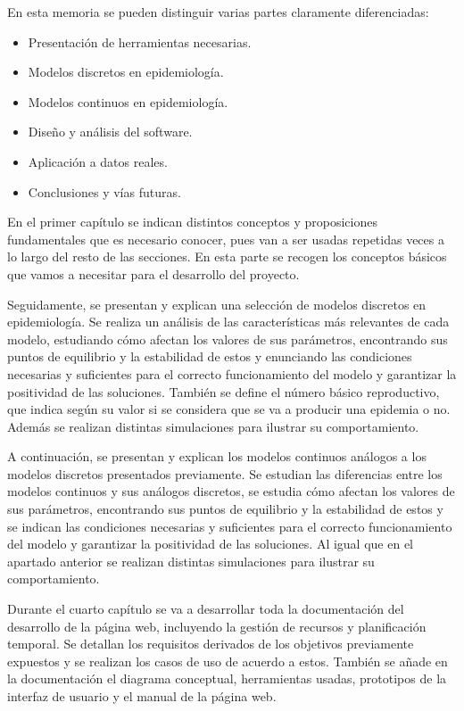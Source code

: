 En esta memoria se pueden distinguir varias partes claramente diferenciadas:

\begin{itemize}
\item Presentación de herramientas necesarias.
\item Modelos discretos en epidemiología.
\item Modelos continuos en epidemiología.
\item Diseño y análisis del software.
\item Aplicación a datos reales.
\item Conclusiones y vías futuras.
\end{itemize}

En el primer capítulo se indican distintos conceptos y proposiciones fundamentales que es necesario conocer, pues van a ser usadas repetidas veces a lo largo del resto de las secciones. En esta parte se recogen los conceptos básicos que vamos a necesitar para el desarrollo del proyecto.

Seguidamente, se presentan y explican una selección de modelos discretos en epidemiología. Se realiza un análisis de las características más relevantes de cada modelo, estudiando cómo afectan los valores de sus parámetros, encontrando sus puntos de equilibrio y la estabilidad de estos y enunciando las condiciones necesarias y suficientes para el correcto funcionamiento del modelo y garantizar la positividad de las soluciones. También se define el número básico reproductivo, que indica según su valor si se considera que se va a producir una epidemia o no. Además se realizan distintas simulaciones para ilustrar su comportamiento. 

A continuación, se presentan y explican los modelos continuos análogos a los modelos discretos presentados previamente. Se estudian las diferencias entre los modelos continuos y sus análogos discretos, se estudia cómo afectan los valores de sus parámetros, encontrando sus puntos de equilibrio y la estabilidad de estos y se indican las condiciones necesarias y suficientes para el correcto funcionamiento del modelo y garantizar la positividad de las soluciones. Al igual que en el apartado anterior se realizan distintas simulaciones para ilustrar su comportamiento.

Durante el cuarto capítulo se va a desarrollar toda la documentación del desarrollo de la página web, incluyendo la gestión de recursos y planificación temporal. Se detallan los requisitos derivados de los objetivos previamente expuestos y se realizan los casos de uso de acuerdo a estos. También se añade en la documentación el diagrama conceptual, herramientas usadas, prototipos de la interfaz de usuario y el manual de la página web.

